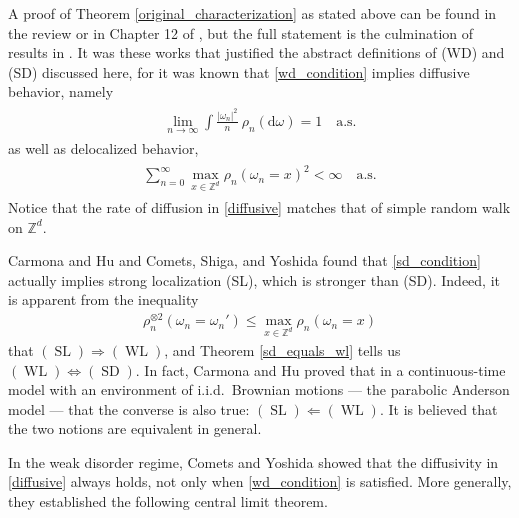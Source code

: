 \documentclass[11pt,reqno]{amsart}
\numberwithin{equation}{section}
\theoremstyle{definition}
\begin{document}
A proof of Theorem \ref{original_characterization} as stated above can be found in the review \cite{comets-shiga-yoshida04} 
or in Chapter 12 of \cite{denHollander09}, 
but the full statement is the culmination of results in \cite{imbrie-spencer88,bolthausen89,sinai95,albeverio-zhou96,song-zhou96,kifer97,carmona-hu02,comets-shiga-yoshida03}.
It was these works that justified the abstract definitions of (WD) and (SD) discussed here, for it was known that \eqref{wd_condition} implies diffusive behavior,
namely
{\begin{align} \begin{split} {
\lim_{n \to \infty} \int \frac{|\omega_n|^2}{n}\ \rho_n({\mathrm{d}} \omega) = 1 \quad \text{a.s.} \label{diffusive}
} \end{split} \end{align}}
as well as delocalized behavior,
{\begin{align} \begin{split} {
\sum_{n = 0}^\infty \max_{x \in {\mathbb{Z}}^d} \rho_n(\omega_n = x)^2 < \infty \quad \text{a.s.}\label{delocalized}
} \end{split} \end{align}}
Notice that the rate of diffusion in \eqref{diffusive} matches that of simple random walk on ${\mathbb{Z}}^d$.

Carmona and Hu \cite{carmona-hu02} 
and Comets, Shiga, and Yoshida \cite{comets-shiga-yoshida03} 
found that \eqref{sd_condition} actually implies strong localization (SL), which is stronger than (SD).
Indeed, it is apparent from the inequality
{\begin{align*} {
\rho_n^{\otimes 2}(\omega_n = \omega_n') \leq \max_{x \in {\mathbb{Z}}^d} \rho_n(\omega_n = x)
} \end{align*}}
that $(\operatorname{SL}) \Rightarrow (\operatorname{WL})$, and Theorem \ref{sd_equals_wl} tells us $(\operatorname{WL}) \Leftrightarrow (\operatorname{SD})$.
In fact, Carmona and Hu \cite{carmona-hu06} proved that in a continuous-time model with an environment of i.i.d.~Brownian motions --- the parabolic Anderson model --- that the converse is also true: $(\operatorname{SL}) \Leftarrow (\operatorname{WL})$. 
It is believed that the two notions are equivalent in general.

In the weak disorder regime, Comets and Yoshida  \cite{comets-yoshida06} showed that the diffusivity in \eqref{diffusive} always holds, not only when \eqref{wd_condition} is satisfied.
More generally, they established the following central limit theorem. 
\end{document}
